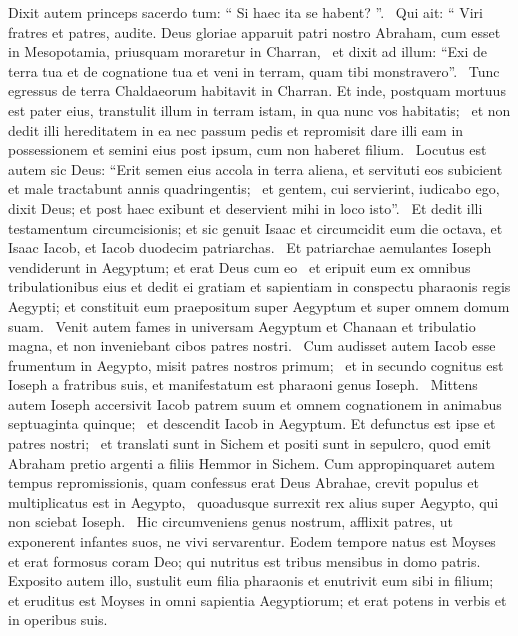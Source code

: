 \begin{biblechapter}
\begin{biblechapter}
\begin{biblechapter}
\begin{biblechapter}
\begin{biblechapter}
\begin{biblechapter}
\begin{biblechapter}
 \verse Dixit autem princeps sacerdo tum: “ Si haec ita se habent? ”. 
 \verse Qui ait: “ Viri fratres et patres, audite. Deus gloriae apparuit patri nostro Abraham, cum esset in Mesopotamia, priusquam moraretur in Charran, 
 \verse et dixit ad illum: “Exi de terra tua et de cognatione tua et veni in terram, quam tibi monstravero”. 
 \verse Tunc egressus de terra Chaldaeorum habitavit in Charran. Et inde, postquam mortuus est pater eius, transtulit illum in terram istam, in qua nunc vos habitatis; 
 \verse et non dedit illi hereditatem in ea nec passum pedis et repromisit dare illi eam in possessionem et semini eius post ipsum, cum non haberet filium. 
 \verse Locutus est autem sic Deus: “Erit semen eius accola in terra aliena, et servituti eos subicient et male tractabunt annis quadringentis; 
 \verse et gentem, cui servierint, iudicabo ego, dixit Deus; et post haec exibunt et deservient mihi in loco isto”. 
 \verse Et dedit illi testamentum circumcisionis; et sic genuit Isaac et circumcidit eum die octava, et Isaac Iacob, et Iacob duodecim patriarchas. 
 \verse Et patriarchae aemulantes Ioseph vendiderunt in Aegyptum; et erat Deus cum eo 
 \verse et eripuit eum ex omnibus tribulationibus eius et dedit ei gratiam et sapientiam in conspectu pharaonis regis Aegypti; et constituit eum praepositum super Aegyptum et super omnem domum suam. 
 \verse Venit autem fames in universam Aegyptum et Chanaan et tribulatio magna, et non inveniebant cibos patres nostri. 
 \verse Cum audisset autem Iacob esse frumentum in Aegypto, misit patres nostros primum; 
 \verse et in secundo cognitus est Ioseph a fratribus suis, et manifestatum est pharaoni genus Ioseph. 
 \verse Mittens autem Ioseph accersivit Iacob patrem suum et omnem cognationem in animabus septuaginta quinque; 
 \verse et descendit Iacob in Aegyptum. Et defunctus est ipse et patres nostri; 
 \verse et translati sunt in Sichem et positi sunt in sepulcro, quod emit Abraham pretio argenti a filiis Hemmor in Sichem.
 \verse Cum appropinquaret autem tempus repromissionis, quam confessus erat Deus Abrahae, crevit populus et multiplicatus est in Aegypto, 
 \verse quoadusque surrexit rex alius super Aegypto, qui non sciebat Ioseph. 
 \verse Hic circumveniens genus nostrum, afflixit patres, ut exponerent infantes suos, ne vivi servarentur.
\verse Eodem tempore natus est Moyses et erat formosus coram Deo; qui nutritus est tribus mensibus in domo patris. 
 \verse Exposito autem illo, sustulit eum filia pharaonis et enutrivit eum sibi in filium; 
 \verse et eruditus est Moyses in omni sapientia Aegyptiorum; et erat potens in verbis et in operibus suis. 

\end{biblechapter}
\end{biblechapter}
\end{biblechapter}
\end{biblechapter}
\end{biblechapter}
\end{biblechapter}
\end{biblechapter}
